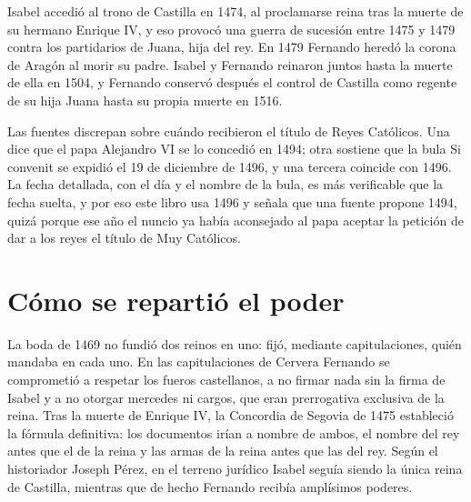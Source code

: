 \documentclass{book}
\begin{document}

Isabel accedió al trono de Castilla en 1474, al proclamarse reina tras la muerte de su hermano Enrique IV, y eso provocó una guerra de sucesión entre 1475 y 1479 contra los partidarios de Juana, hija del rey. En 1479 Fernando heredó la corona de Aragón al morir su padre. Isabel y Fernando reinaron juntos hasta la muerte de ella en 1504, y Fernando conservó después el control de Castilla como regente de su hija Juana hasta su propia muerte en 1516.


Las fuentes discrepan sobre cuándo recibieron el título de Reyes Católicos. Una dice que el papa Alejandro VI se lo concedió en 1494; otra sostiene que la bula Si convenit se expidió el 19 de diciembre de 1496, y una tercera coincide con 1496. La fecha detallada, con el día y el nombre de la bula, es más verificable que la fecha suelta, y por eso este libro usa 1496 y señala que una fuente propone 1494, quizá porque ese año el nuncio ya había aconsejado al papa aceptar la petición de dar a los reyes el título de Muy Católicos.


\section{Cómo se repartió el poder}

La boda de 1469 no fundió dos reinos en uno: fijó, mediante capitulaciones, quién mandaba en cada uno. En las capitulaciones de Cervera Fernando se comprometió a respetar los fueros castellanos, a no firmar nada sin la firma de Isabel y a no otorgar mercedes ni cargos, que eran prerrogativa exclusiva de la reina. Tras la muerte de Enrique IV, la Concordia de Segovia de 1475 estableció la fórmula definitiva: los documentos irían a nombre de ambos, el nombre del rey antes que el de la reina y las armas de la reina antes que las del rey. Según el historiador Joseph Pérez, en el terreno jurídico Isabel seguía siendo la única reina de Castilla, mientras que de hecho Fernando recibía amplísimos poderes.
\end{document}
